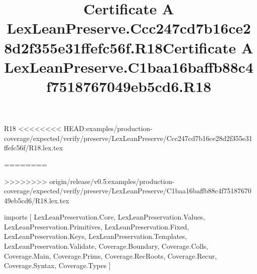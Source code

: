 \begin{lexlean}{R18}
<<<<<<<< HEAD:examples/production-coverage/expected/verify/preserve/LexLeanPreserve/Ccc247cd7b16ce28d2f355e31ffefc56f/R18.lex.tex
\title{Certificate A LexLeanPreserve.Ccc247cd7b16ce28d2f355e31ffefc56f.R18}
========
\title{Certificate A LexLeanPreserve.C1baa16baffb88c4f7518767049eb5cd6.R18}
>>>>>>>> origin/release/v0.5:examples/production-coverage/expected/verify/preserve/LexLeanPreserve/C1baa16baffb88c4f7518767049eb5cd6/R18.lex.tex
\begin{coremodule}
imports [
  LexLeanPreservation.Core,
  LexLeanPreservation.Values,
  LexLeanPreservation.Primitives,
  LexLeanPreservation.Fixed,
  LexLeanPreservation.Keys,
  LexLeanPreservation.Templates,
  LexLeanPreservation.Validate,
  Coverage.Boundary,
  Coverage.Colls,
  Coverage.Main,
  Coverage.Prims,
  Coverage.RecRoots,
  Coverage.Recur,
  Coverage.Syntax,
  Coverage.Types
]


\end{coremodule}
\end{lexlean}

